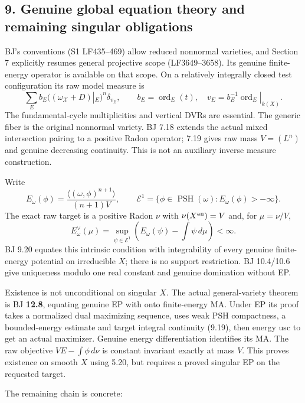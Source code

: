 \documentclass[
  10pt,
]{article}
\begin{document}
\subsection{9. Genuine global equation theory and remaining singular
obligations}\label{genuine-global-equation-theory-and-remaining-singular-obligations}

BJ's conventions (S1 LF435--469) allow reduced nonnormal varieties, and
Section 7 explicitly resumes general projective scope (LF3649--3658).
Its genuine finite-energy operator is available on that scope. On a
relatively integrally closed test configuration its raw model measure is
\[\sum_E b_E\bigl((\omega_{\mathcal X}+D)|_E\bigr)^n\delta_{v_E},\qquad
b_E=\operatorname{ord}_E(t),\quad v_E=b_E^{-1}\operatorname{ord}_E|_{k(X)}.\]
The fundamental-cycle multiplicities and vertical DVRs are essential.
The generic fiber is the original nonnormal variety. BJ 7.18 extends the
actual mixed intersection pairing to a positive Radon operator; 7.19
gives raw mass \(V=(L^n)\) and genuine decreasing continuity. This is
not an auxiliary inverse measure construction.

Write
\[E_\omega(\phi)=\frac{\langle(\omega,\phi)^{n+1}\rangle}{(n+1)V},\qquad
\mathcal E^1=\{\phi\in\operatorname{PSH}(\omega):E_\omega(\phi)>-\infty\}.\]
The exact raw target is a positive Radon \(\nu\) with
\(\nu(X^{\rm an})=V\) and, for \(\mu=\nu/V\),
\[E_\omega^\vee(\mu)=\sup_{\psi\in\mathcal E^1}\left(E_\omega(\psi)-\int\psi\,d\mu\right)<\infty.\]
BJ 9.20 equates this intrinsic condition with integrability of every
genuine finite-energy potential on irreducible \(X\); there is no
support restriction. BJ 10.4/10.6 give uniqueness modulo one real
constant and genuine domination without EP.

Existence is not unconditional on singular \(X\). The actual
general-variety theorem is BJ \textbf{12.8}, equating genuine EP with
onto finite-energy MA. Under EP its proof takes a normalized dual
maximizing sequence, uses weak PSH compactness, a bounded-energy
estimate and target integral continuity (9.19), then energy usc to get
an actual maximizer. Genuine energy differentiation identifies its MA.
The raw objective \(VE-\int\phi\,d\nu\) is constant invariant exactly at
mass \(V\). This proves existence on smooth \(X\) using 5.20, but
requires a proved singular EP on the requested target.

The remaining chain is concrete:
\end{document}
